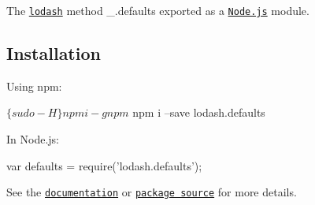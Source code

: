 The \href{https://lodash.com/}{\tt lodash} method {\ttfamily \+\_\+.\+defaults} exported as a \href{https://nodejs.org/}{\tt Node.\+js} module.

\subsection*{Installation}

Using npm\+: 
\begin{DoxyCode}
$ \{sudo -H\} npm i -g npm
$ npm i --save lodash.defaults
\end{DoxyCode}


In Node.\+js\+: 
\begin{DoxyCode}
var defaults = require('lodash.defaults');
\end{DoxyCode}


See the \href{https://lodash.com/docs#defaults}{\tt documentation} or \href{https://github.com/lodash/lodash/blob/4.2.0-npm-packages/lodash.defaults}{\tt package source} for more details. 